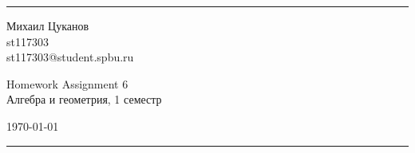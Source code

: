 \documentclass[a4paper, 12pt]{article}
\begin{document}

\fancyhead[C]{}
\hrule \medskip %
\begin{minipage}{0.295\textwidth}
\raggedright\footnotesize
Михаил Цуканов \hfill\\
st117303 \hfill\\
st117303@student.spbu.ru
\end{minipage}
\begin{minipage}{0.4\textwidth}
\centering\large
Homework Assignment 6\\
\normalsize
Алгебра и геометрия, 1 семестр\\
\end{minipage}
\begin{minipage}{0.295\textwidth}
\raggedleft
\today\hfill\\
\end{minipage}
\medskip\hrule
\bigskip

\end{document}
